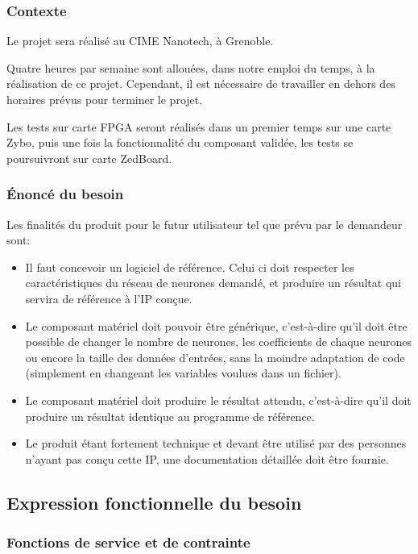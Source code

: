 \subsubsection{Contexte}

Le projet sera réalisé au CIME Nanotech, à Grenoble.

Quatre heures par semaine sont allouées, dans notre emploi du temps, à la réalisation de ce projet. Cependant,
il est nécessaire de travailler en dehors des horaires prévus pour terminer
le projet.

Les tests sur carte FPGA seront réalisés dans un premier temps sur une carte Zybo,
puis une fois la fonctionnalité du composant validée, les tests se poursuivront
sur carte ZedBoard.

\subsubsection{Énoncé du besoin}

Les finalités du produit pour le futur utilisateur tel que prévu par le
demandeur sont:
\begin{itemize}
	\item Il faut concevoir un logiciel de référence.
		Celui ci doit respecter les caractéristiques du réseau de neurones demandé, et produire un résultat qui servira de référence à l'IP conçue.
	\item Le composant matériel doit pouvoir être générique,
		c'est-à-dire qu'il doit être possible de changer le nombre de
		neurones, les coefficients de chaque neurones
		ou encore la taille des données d'entrées,
		sans la moindre adaptation de code (simplement en changeant les variables voulues dans un fichier).
	\item Le composant matériel doit produire le résultat attendu, c'est-à-dire qu'il
		doit produire un résultat identique au programme de référence.
	\item Le produit étant fortement technique et devant être utilisé par des personnes n'ayant pas conçu cette IP, une documentation détaillée doit être fournie.
\end{itemize}

\subsection{Expression fonctionnelle du besoin}

\subsubsection{Fonctions de service et de contrainte}

